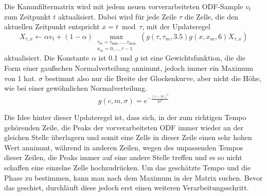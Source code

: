 {{{			%
			Die Kammfiltermatrix wird mit jedem neuen vorverarbeiteten ODF-Sample $v_t$ zum Zeitpunkt $t$ aktualisiert.
			Dabei wird für jede Zeile $\tau$ die Zelle,
				die den aktuellen Zeitpunkt entspricht $x = t \bmod \tau$,
				mit der Updateregel
				\begin{equation}
					X_{\tau, x} \leftarrow
						\alpha v_t +
						(1 - \alpha) \max_{\substack{\tau_m = \tau_{\text{min}}, ..., \tau_{\text{max}} \\ x_m = 0, ..., \tau - 1}}
							(g(\tau, \tau_m, 3.5) g(x, x_m, 6) X_{\tau, x})
				\end{equation}
				aktualisiert.
			Die Konstante $\alpha$ ist \num{0.1}
				und $g$ ist eine Gewichtsfunktion,
				die die Form einer gaußschen Normalverteilung annimmt,
				jedoch immer ein Maximum von \num{1} hat.
			$\sigma$ bestimmt also nur die Breite der Glockenkurve,
				aber nicht die Höhe,
				wie bei einer gewöhnlichen Normalverteilung.
			\begin{equation}
				g(c, m, \sigma) = e^{-\frac{(c - m)^2}{2\sigma^2}}
			\end{equation}

			Die Idee hinter dieser Updateregel ist,
				dass sich,
				in der zum richtigen Tempo gehörenden Zeile,
				die Peaks der vorverarbeiteten ODF immer wieder an der gleichen Stelle überlagern
				und somit eine Zelle in dieser Zeile einen sehr hohen Wert annimmt,
				während in anderen Zeilen,
				wegen des unpassenden Tempos dieser Zeilen,
				die Peaks immer auf eine andere Stelle treffen
				und es so nicht schaffen eine einzelne Zelle hochzudrücken.
			Um das geschätzte Tempo und die Phase zu bestimmen,
				kann man nach dem Maximum in der Matrix suchen.
			Bevor das geschiet,
				durchläuft diese jedoch erst einen weiteren Verarbeitungsschritt.

}}}
